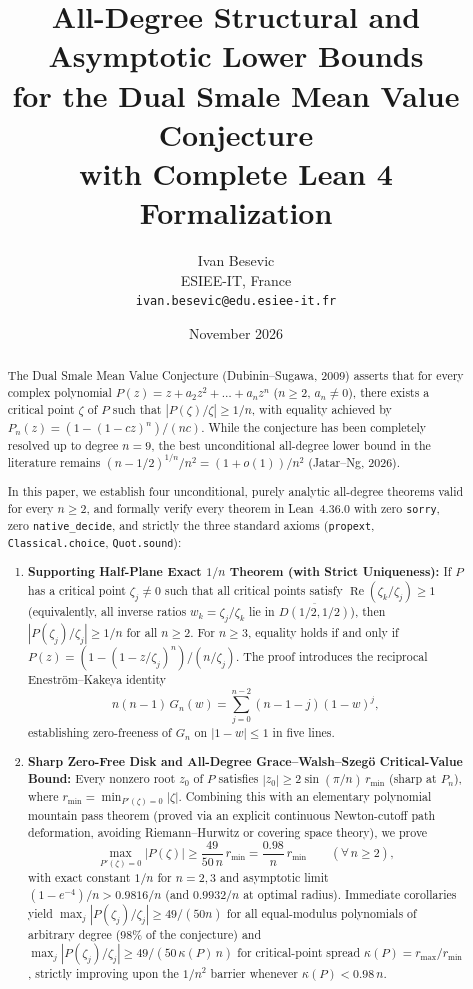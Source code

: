 \documentclass[11pt,a4paper]{article}
\title{All-Degree Structural and Asymptotic Lower Bounds\\
for the Dual Smale Mean Value Conjecture\\
with Complete Lean 4 Formalization}
\author{Ivan Besevic\\
ESIEE-IT, France\\
\texttt{ivan.besevic@edu.esiee-it.fr}}
\date{November 2026}
\theoremstyle{definition}
\theoremstyle{remark}
\DeclareMathOperator{\RePart}{Re}
\begin{document}
\maketitle

\begin{abstract}
The Dual Smale Mean Value Conjecture (Dubinin--Sugawa, 2009) asserts that for every complex polynomial $P(z) = z + a_2 z^2 + \dots + a_n z^n$ ($n \ge 2$, $a_n \neq 0$), there exists a critical point $\zeta$ of $P$ such that $|P(\zeta)/\zeta| \ge 1/n$, with equality achieved by $P_n(z) = (1 - (1 - cz)^n)/(nc)$. While the conjecture has been completely resolved up to degree $n = 9$, the best unconditional all-degree lower bound in the literature remains $(n - 1/2)^{1/n}/n^2 = (1 + o(1))/n^2$ (Jatar--Ng, 2026).

In this paper, we establish four unconditional, purely analytic all-degree theorems valid for every $n \ge 2$, and formally verify every theorem in Lean~4.36.0 with zero \texttt{sorry}, zero \texttt{native\_decide}, and strictly the three standard axioms (\texttt{propext}, \texttt{Classical.choice}, \texttt{Quot.sound}):
\begin{enumerate}
\item \textbf{Supporting Half-Plane Exact $1/n$ Theorem (with Strict Uniqueness):} If $P$ has a critical point $\zeta_j \neq 0$ such that all critical points satisfy $\RePart(\zeta_k/\zeta_j) \ge 1$ (equivalently, all inverse ratios $w_k = \zeta_j/\zeta_k$ lie in $\overline{D(1/2, 1/2)}$), then $|P(\zeta_j)/\zeta_j| \ge 1/n$ for all $n \ge 2$. For $n \ge 3$, equality holds if and only if $P(z) = (1 - (1 - z/\zeta_j)^n)/(n/\zeta_j)$. The proof introduces the reciprocal Enestr\"om--Kakeya identity
\[
n(n-1)\, G_n(w) = \sum_{j=0}^{n-2} (n - 1 - j)(1 - w)^j,
\]
establishing zero-freeness of $G_n$ on $|1 - w| \le 1$ in five lines.
\item \textbf{Sharp Zero-Free Disk and All-Degree Grace--Walsh--Szeg\"o Critical-Value Bound:} Every nonzero root $z_0$ of $P$ satisfies $|z_0| \ge 2\sin(\pi/n)\,r_{\min}$ (sharp at $P_n$), where $r_{\min} = \min_{P'(\zeta)=0} |\zeta|$. Combining this with an elementary polynomial mountain pass theorem (proved via an explicit continuous Newton-cutoff path deformation, avoiding Riemann--Hurwitz or covering space theory), we prove
\[
\max_{P'(\zeta)=0} |P(\zeta)| \ge \frac{49}{50\,n}\,r_{\min} = \frac{0.98}{n}\,r_{\min} \qquad (\forall\, n \ge 2),
\]
with exact constant $1/n$ for $n = 2, 3$ and asymptotic limit $(1 - e^{-4})/n > 0.9816/n$ (and $0.9932/n$ at optimal radius). Immediate corollaries yield $\max_j |P(\zeta_j)/\zeta_j| \ge 49/(50n)$ for all equal-modulus polynomials of arbitrary degree (98\% of the conjecture) and $\max_j |P(\zeta_j)/\zeta_j| \ge 49/(50\,\kappa(P)\,n)$ for critical-point spread $\kappa(P) = r_{\max}/r_{\min}$, strictly improving upon the $1/n^2$ barrier whenever $\kappa(P) < 0.98\,n$.

\end{enumerate}
\end{abstract}
\end{document}
